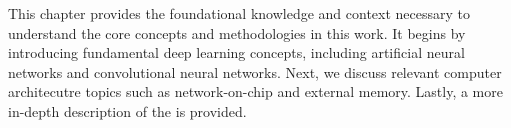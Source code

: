 This chapter provides the foundational knowledge and context necessary to understand the core concepts and methodologies in this work.
It begins by introducing fundamental deep learning concepts, including artificial neural networks and convolutional neural networks.  
Next, we discuss relevant computer architecutre topics such as network-on-chip and external memory.
Lastly, a more in-depth description of the \graicore{} is provided.

